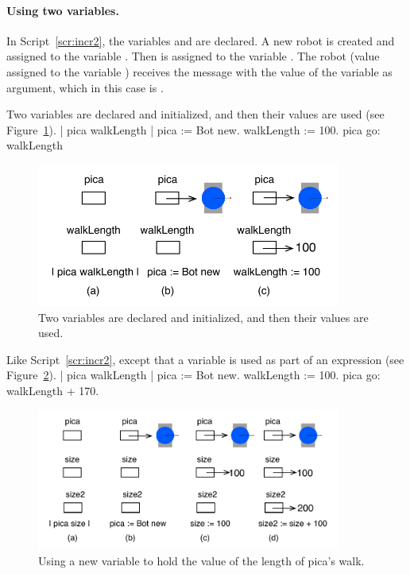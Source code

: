 \documentclass[a4paper,10pt,twoside]{book}
\begin{document}
\paragraph{Using two variables.}
In Script~\ref{scr:incr2}, the variables  and  are declared. A new robot is created and assigned to the variable . Then  is assigned to the variable . The robot (value assigned to the variable ) receives the message  with the value of the variable  as argument, which in this case is . 

\begin{script}[incr2]{Two variables are declared and initialized, and then their values are used (see Figure~\ref{fig:boxOne2}).}
	| pica walkLength | 
	pica := Bot new. 
	walkLength := 100. 
	pica go: walkLength
\end{script}

\begin{figure}[h]
	\centerline{\includegraphics[width=10cm]{boxOne2}}
	\caption{Two variables are declared and initialized, and then their values are used.  
	\label{fig:boxOne2}}
\end{figure}



\begin{script}[incr3]{Like Script~\ref{scr:incr2}, except that a variable is used as part of an expression  (see Figure~\ref{fig:boxOne3}).}
	| pica walkLength | 
	pica := Bot new. 
	walkLength := 100. 
	pica go: walkLength + 170. 
\end{script}

\begin{figure}[h]
	\centerline{\includegraphics[width=10cm]{boxSize2}}
	\caption{Using a new variable to hold the value of the length of pica’s walk.  
	\label{fig:boxOne3}}
\end{figure}
\end{document}
